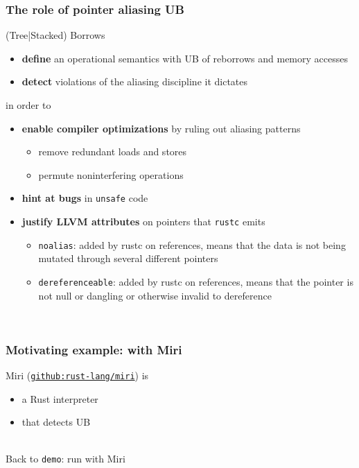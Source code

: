 \begin{frame}
    \frametitle{The role of pointer aliasing UB}
    (Tree|Stacked) Borrows
    \begin{itemize}
        \item \textbf{define} an operational semantics with UB of reborrows and memory accesses
        \item \textbf{detect} violations of the aliasing discipline it dictates
    \end{itemize}
    in order to
    \begin{itemize}
        \item \textbf{enable compiler optimizations} by ruling out aliasing patterns
            \begin{itemize}
                \item remove redundant loads and stores
                \item permute noninterfering operations
            \end{itemize}
        \item \textbf{hint at bugs} in \texttt{unsafe} code
        \item \textbf{justify LLVM attributes} on pointers that \texttt{rustc} emits
            \begin{itemize}
                \item \texttt{noalias}: added by rustc on references, means that the data
                    is not being mutated through several different pointers
                \item \texttt{dereferenceable}: added by rustc on references, means that
                    the pointer is not null or dangling or otherwise invalid to dereference
            \end{itemize}
    \end{itemize}~\\
\end{frame}

\begin{frame}[fragile]
    \frametitle{Motivating example: with Miri}
    Miri (\href{https://github.com/rust-lang/miri}{\texttt{github:rust-lang/miri}}) is
    \begin{itemize}
        \item a Rust interpreter
        \item that detects UB
    \end{itemize}~\\

    Back to \texttt{demo}: run with Miri
\end{frame}

